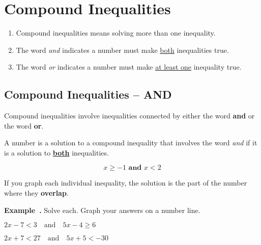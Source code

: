\documentclass{article}
\newcounter{example}[section]
\newenvironment{example}[1][]{\refstepcounter{example}\par\medskip
   {\color{red}\textbf{Example~\theexample. #1}}}{\medskip}
\begin{document}
\section*{Compound Inequalities}

\begin{tcolorbox}[colframe=orange!70!white, coltitle=black, title=\textbf{Summary}]
\begin{enumerate}
    \item Compound inequalities means solving more than one inequality.
    \item The word \textit{and} indicates a number must make \underline{both} inequalities true.
    \item The word \textit{or} indicates a number must make \underline{at least one} inequality true.
\end{enumerate}
\end{tcolorbox}
\bigskip 

\subsection*{Compound Inequalities -- AND}

Compound inequalities involve inequalities connected by either the word {\color{blue}\textbf{and}} or the word {\color{red}\textbf{or}}.	
\bigskip 

A number is a solution to a compound inequality that involves the word \emph{and} if it is a solution to \textbf{\underline{both}} inequalities.

\[x \geq -1 \textbf{ and } x < 2\]

\begin{center}
\end{center}

If you graph each individual inequality, the solution is the part of the number where they {\color{blue}\textbf{overlap}}.
\bigskip 

\begin{example}
Solve each. Graph your answers on a number line.
\begin{enumerate}[(a)]
\begin{multicols}{2}
    \item $2x-7<3 \quad \text{and} \quad 5x-4\geq 6$  
    \item $2x + 7 < 27 \quad \text{and} \quad 5x + 5 < -30$
\end{multicols}
\end{enumerate}
\end{example}
\end{document}

